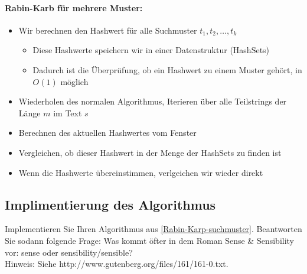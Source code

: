 \paragraph{Rabin-Karb für mehrere Muster:}\cite{Stackoverflow-Rabin-Karp}
\begin{itemize}
	\item Wir berechnen den Hashwert für alle Suchmuster $t_1,t_2, \dots, t_k$
	\begin{itemize}
		\item Diese Hashwerte speichern wir in einer Datenstruktur (HashSets)
		\item Dadurch ist die Überprüfung, ob ein Hashwert zu einem Muster gehört, in $O(1)$ möglich
	\end{itemize}
	\item Wiederholen des normalen Algorithmus, Iterieren über alle Teilstrings der Länge $m$ im Text $s$
	\item Berechnen des aktuellen Hashwertes vom Fenster
	\item Vergleichen, ob dieser Hashwert in der Menge der HashSets zu finden ist
	\item Wenn die Hashwerte übereinstimmen, verlgeichen wir wieder direkt
\end{itemize}



\subsection{Implimentierung des Algorithmus}
Implementieren Sie Ihren Algorithmus aus \ref{Rabin-Karp-suchmuster}. Beantworten Sie sodann folgende Frage: Was kommt öfter in dem Roman Sense \& Sensibility vor: sense oder sensibility/sensible?\\
Hinweis: Siehe http://www.gutenberg.org/files/161/161-0.txt.


